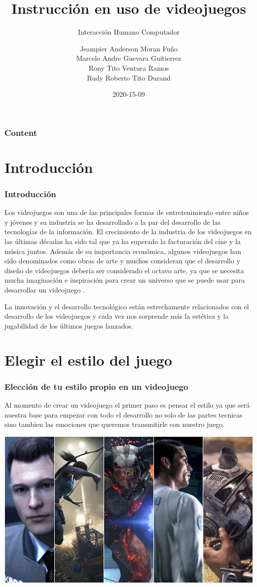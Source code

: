 \documentclass[11pt]{beamer}
\title[Introducción]{\bf\Huge Instrucción en uso de videojuegos}
\subtitle{Interacción Humano Computador}
\author[rescobedoq]
{
	Jeampier Anderson Moran Fuño \inst{1}\\
	Marcelo Andre Guevara Guitierrez\inst{1}\\
	Rony Tito Ventura Ramos\inst{1}\\
	Rudy Roberto Tito Durand\inst{1}
}
\institute[UNSA]
{
\inst{1}%
System Engineering School\\
System Engineering and Informatic Department\\
Production and Services Faculty\\
San Agustin National University of Arequipa
}
\date[2020-15-09]{\scriptsize{2020-15-09}}
\begin{document}
\begin{frame}
\titlepage
\end{frame}

\begin{frame}
\frametitle{Content}
\tableofcontents
\end{frame}

\section{Introducción}
\begin{frame}
\frametitle{Introducción}
Los videojuegos son una de las principales formas de entretenimiento entre niños y jóvenes y su industria se ha desarrollado a la par del desarrollo de las tecnologías de la información. El crecimiento de la industria de los videojuegos en las últimas décadas ha sido tal que ya ha superado la facturación del cine y la música juntos. Además de su importancia económica, algunos videojuegos han sido denominados como obras de arte y muchos consideran que el desarrollo y diseño de videojuegos debería ser considerado el octavo arte, ya que se necesita mucha imaginación e inspiración para crear un universo que se puede usar para desarrollar un videojuego .

La innovación y el desarrollo tecnológico están estrechamente relacionados con el desarrollo de los videojuegos y cada vez nos sorprende más la estética y la jugabilidad de los últimos juegos lanzados.

\end{frame}

\section{Elegir el estilo del juego}
\begin{frame}
\frametitle{Elección de tu estilo propio en un videojuego}
Al momento de crear un videojuego el primer paso es pensar el estilo ya que será nuestra base para empezar con todo el desarrollo no solo de las partes tecnicas sino tambien las emociones que queremos transmitirle con nuestro juego.
\begin{center}
 \includegraphics[scale=0.2,keepaspectratio=true]{img/estilos de juego.jpg}
\end{center}
\end{frame}
\end{document}
